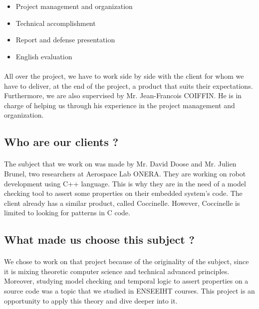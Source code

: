\documentclass{report}
\begin{document}
\vspace{4mm}
\begin{itemize}
\item Project management and organization\vspace{1mm}
\item Technical accomplishment\vspace{1mm}
\item Report and defense presentation\vspace{1mm}
\item English evaluation\vspace{1mm}
\end{itemize}

\paragraph{}
\hspace{4mm}\textnormal{All over the project, we have to work side by side with the client
 for whom we have to deliver, at the end of the project,
 a product that suits their expectations. Furthermore, we are 
also supervised by Mr. Jean-Francois COIFFIN. He is in charge 
of helping us through his experience in the project management and 
organization.}

\subsection{Who are our clients ?}

\paragraph{}
\hspace{4mm}\textnormal{The subject that we work on was made by Mr. David Doose and
 Mr. Julien Brunel, two researchers at Aerospace Lab ONERA. They are
 working on robot development using C++ language. This is why they are
 in the need of a model checking tool to assert some properties on their 
embedded system's code. The client already has a similar product, called Coccinelle. 
However, Coccinelle is limited to looking for patterns in C code.}

\subsection{What made us choose this subject ?}

\paragraph{}
\hspace{4mm}\textnormal{We chose to work on that project because of the originality of the subject, since it is mixing theoretic computer science and technical advanced principles.
       Moreover, studying model checking and temporal logic to assert properties on a source code was a topic that we studied in ENSEEIHT courses. This project is an opportunity to apply this theory and dive deeper into it.}
\end{document}
